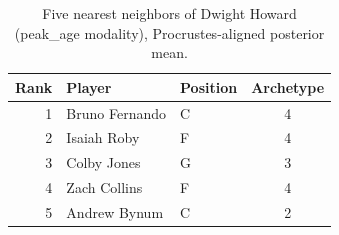 \begin{table}[htbp]
  \centering\small
  \begin{tabular}{rllc}
    \toprule
    Rank & Player & Position & Archetype \\
    \midrule
    1 & Bruno Fernando & C & 4 \\
    2 & Isaiah Roby & F & 4 \\
    3 & Colby Jones & G & 3 \\
    4 & Zach Collins & F & 4 \\
    5 & Andrew Bynum & C & 2 \\
    \bottomrule
  \end{tabular}
  \caption{Five nearest neighbors of Dwight Howard (peak_age modality), Procrustes-aligned posterior mean.}
  \label{tab:Dwight_Howard_neighbors_peak_age}
\end{table}

